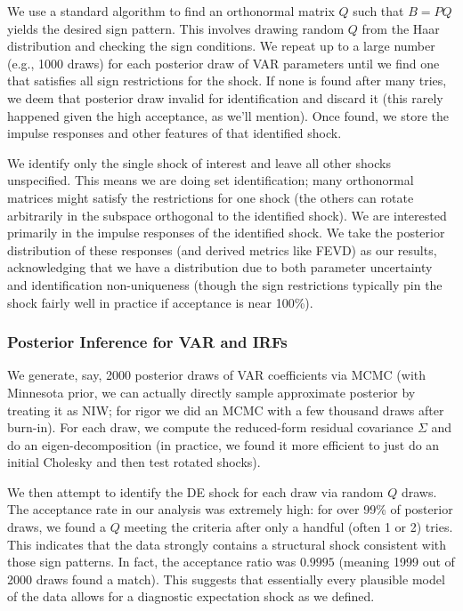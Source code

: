 \documentclass[12pt]{article}
\begin{document}
We use a standard algorithm to find an orthonormal matrix $Q$ such that $B = PQ$ yields the desired sign pattern. This involves drawing random $Q$ from the Haar distribution and checking the sign conditions. We repeat up to a large number (e.g., 1000 draws) for each posterior draw of VAR parameters until we find one that satisfies all sign restrictions for the shock. If none is found after many tries, we deem that posterior draw invalid for identification and discard it (this rarely happened given the high acceptance, as we'll mention). Once found, we store the impulse responses and other features of that identified shock.

We identify only the single shock of interest and leave all other shocks unspecified. This means we are doing set identification; many orthonormal matrices might satisfy the restrictions for one shock (the others can rotate arbitrarily in the subspace orthogonal to the identified shock). We are interested primarily in the impulse responses of the identified shock. We take the posterior distribution of these responses (and derived metrics like FEVD) as our results, acknowledging that we have a distribution due to both parameter uncertainty and identification non-uniqueness (though the sign restrictions typically pin the shock fairly well in practice if acceptance is near 100\%).

\subsubsection{Posterior Inference for VAR and IRFs}
We generate, say, 2000 posterior draws of VAR coefficients via MCMC (with Minnesota prior, we can actually directly sample approximate posterior by treating it as NIW; for rigor we did an MCMC with a few thousand draws after burn-in). For each draw, we compute the reduced-form residual covariance $\Sigma$ and do an eigen-decomposition (in practice, we found it more efficient to just do an initial Cholesky and then test rotated shocks).

We then attempt to identify the DE shock for each draw via random $Q$ draws. The acceptance rate in our analysis was extremely high: for over 99\% of posterior draws, we found a $Q$ meeting the criteria after only a handful (often 1 or 2) tries. This indicates that the data strongly contains a structural shock consistent with those sign patterns. In fact, the acceptance ratio was $0.9995$ (meaning 1999 out of 2000 draws found a match). This suggests that essentially every plausible model of the data allows for a diagnostic expectation shock as we defined.
\end{document}
